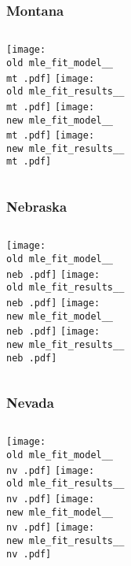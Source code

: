 \documentclass{beamer}
\newcommand{\old}{api-370-prod/pyseir/state_summaries/reports/}
\newcommand{\new}{new/pyseir/state_summaries/reports/}
\newcommand{\mt}{Montana__30}
\newcommand{\neb}{Nebraska__31}
\newcommand{\nv}{Nevada__32}
\begin{document}
\begin{frame}
\frametitle{Montana}
    \begin{columns}[t]

       \texttt{[image: \\old mle\_fit\_model\_\_\\mt .pdf]}
       \texttt{[image: \\old mle\_fit\_results\_\_\\mt .pdf]}   
       \texttt{[image: \\new mle\_fit\_model\_\_\\mt .pdf]}
       \texttt{[image: \\new mle\_fit\_results\_\_\\mt .pdf]}   
\end{columns}
\end{frame}

\begin{frame}
\frametitle{Nebraska}
    \begin{columns}[t]

       \texttt{[image: \\old mle\_fit\_model\_\_\\neb .pdf]}
       \texttt{[image: \\old mle\_fit\_results\_\_\\neb .pdf]}   
       \texttt{[image: \\new mle\_fit\_model\_\_\\neb .pdf]}
       \texttt{[image: \\new mle\_fit\_results\_\_\\neb .pdf]}   
\end{columns}
\end{frame}

\begin{frame}
\frametitle{Nevada}
    \begin{columns}[t]

       \texttt{[image: \\old mle\_fit\_model\_\_\\nv .pdf]}
       \texttt{[image: \\old mle\_fit\_results\_\_\\nv .pdf]}   
       \texttt{[image: \\new mle\_fit\_model\_\_\\nv .pdf]}
       \texttt{[image: \\new mle\_fit\_results\_\_\\nv .pdf]}   
\end{columns}
\end{frame}
\end{document}
